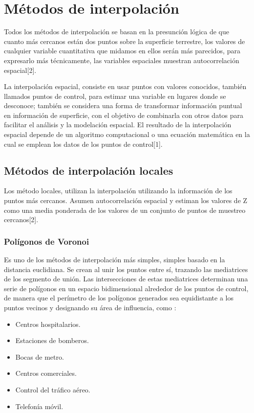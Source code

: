 \section{Métodos de interpolación}
\label{sec:cap2-metodos-interpolacion}
Todos los métodos de interpolación se basan en la presunción lógica de que
cuanto más cercanos están dos puntos sobre la superficie terrestre, los
valores de cualquier variable cuantitativa que midamos en ellos serán más
parecidos, para expresarlo más técnicamente, las variables espaciales
muestran autocorrelación espacial[2].

La interpolación espacial, consiste en usar puntos con valores conocidos,
también llamados puntos de control, para estimar una variable en lugares
donde se desconoce; también se considera una forma de transformar información
puntual en información de superficie, con el objetivo de combinarla con
otros datos para facilitar el análisis y la modelación espacial.
El resultado de la interpolación espacial depende de un algoritmo
computacional o una ecuación matemática en la cual se emplean los datos
de los puntos de control[1].

\subsection{Métodos de interpolación locales}
Los método locales, utilizan la interpolación utilizando la información
de los puntos más cercanos. Asumen autocorrelación espacial y estiman los
valores de Z como una media ponderada de los valores de un conjunto de
puntos de muestreo cercanos[2].

\subsubsection{Polígonos de Voronoi}
Es uno de los métodos de interpolación más simples, simples basado en la
distancia euclidiana. Se crean al unir los puntos entre sí, trazando las
mediatrices de los segmento de unión. Las intersecciones de estas mediatrices
determinan una serie de polígonos en un espacio bidimensional alrededor de
los puntos de control, de manera que el perímetro de los polígonos generados
sea equidistante a los puntos vecinos y designando su área de influencia, como :
\begin{itemize}
    \item Centros hospitalarios.
    \item Estaciones de bomberos.
    \item Bocas de metro.
    \item Centros comerciales.
    \item Control del tráfico aéreo.
    \item Telefonía móvil.
\end{itemize}

